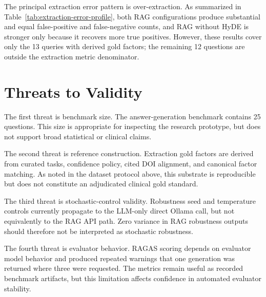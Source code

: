 The principal extraction error pattern is over-extraction. As summarized in Table~\ref{tab:extraction-error-profile}, both RAG configurations produce substantial and equal false-positive and false-negative counts, and RAG without HyDE is stronger only because it recovers more true positives. However, these results cover only the 13 queries with derived gold factors; the remaining 12 questions are outside the extraction metric denominator.

\section{Threats to Validity}

The first threat is benchmark size. The answer-generation benchmark contains 25 questions. This size is appropriate for inspecting the research prototype, but does not support broad statistical or clinical claims.

The second threat is reference construction. Extraction gold factors are derived from curated tasks, confidence policy, cited DOI alignment, and canonical factor matching. As noted in the dataset protocol above, this substrate is reproducible but does not constitute an adjudicated clinical gold standard.

The third threat is stochastic-control validity. Robustness seed and temperature controls currently propagate to the LLM-only direct Ollama call, but not equivalently to the RAG API path. Zero variance in RAG robustness outputs should therefore not be interpreted as stochastic robustness.

The fourth threat is evaluator behavior. RAGAS scoring depends on evaluator model behavior and produced repeated warnings that one generation was returned where three were requested. The metrics remain useful as recorded benchmark artifacts, but this limitation affects confidence in automated evaluator stability.

